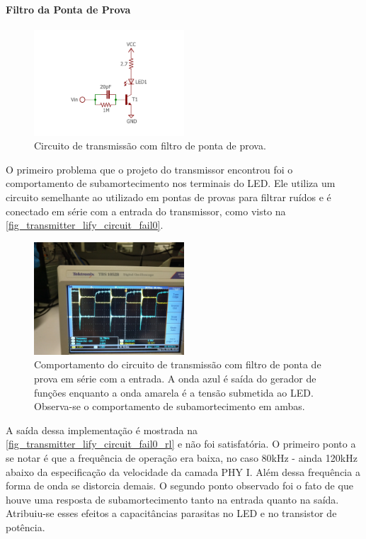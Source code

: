 	\paragraph{Filtro da Ponta de Prova}
	\begin{figure}[htb]
		\caption{\label{fig_transmitter_lify_circuit_fail0}Circuito de transmissão com filtro de ponta de prova.}
		\centering		%
		\includegraphics[width=0.5\textwidth, trim={2cm 1cm 2cm 2cm}, clip]{circuits/transmitter_fail0.pdf}
	\end{figure}
	O primeiro problema que o projeto do transmissor encontrou foi o comportamento de subamortecimento nos terminais do LED. Ele utiliza um circuito semelhante ao utilizado em pontas de provas para filtrar ruídos e é conectado em série com a entrada do transmissor, como visto na \autoref{fig_transmitter_lify_circuit_fail0}.
	\begin{figure}[htb]
		\caption{\label{fig_transmitter_lify_circuit_fail0_rl}Comportamento do circuito de transmissão com filtro de ponta de prova em série com a entrada. A onda azul é saída do gerador de funções enquanto a onda amarela é a tensão submetida ao LED. Observa-se o comportamento de subamortecimento em ambas.}
		\centering		%
		\includegraphics[width=0.5\textwidth, trim={30cm 0cm 2cm 40cm}, clip]{circuits/photos/TX_probe_result.jpg}
	\end{figure}

	A saída dessa implementação é mostrada na \autoref{fig_transmitter_lify_circuit_fail0_rl} e não foi satisfatória. O primeiro ponto a se notar é que a frequência de operação era baixa, no caso 80kHz - ainda 120kHz abaixo da especificação da velocidade da camada PHY I. Além dessa frequência a forma de onda se distorcia demais. O segundo ponto observado foi o fato de que houve uma resposta de subamortecimento tanto na entrada quanto na saída. Atribuiu-se esses efeitos a capacitâncias parasitas no LED e no transistor de potência.
	
